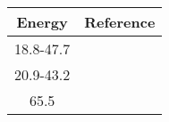 \begin{tabular}{|c||c|} 
    \hline 
    \bf{Energy} & \bf{Reference} \\
    \hline
    \hline 
    18.8-47.7 & \cite{Carlson1975}\\
    20.9-43.2 & \cite{Slaus1975}\\
    65.5 & \cite{Ingemarsson1999}\\
    \hline
\end{tabular}
